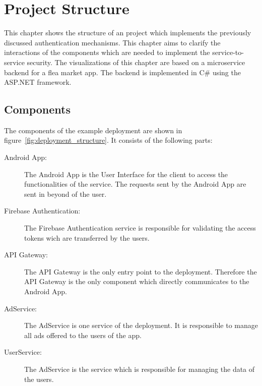 \chapter{Project Structure}
\label{cha:project_structure}
This chapter shows the structure of an project which implements the previously discussed authentication mechanisms.
This chapter aims to clarify the interactions of the components which are needed to implement the service-to-service security.
The visualizations of this chapter are based on a microservice backend for a flea market app.
The backend is implemented in C\# using the ASP.NET framework.

\section{Components}
The components of the example deployment are shown in figure~\ref{fig:deployment_structure}. 
It consists of the following parts:
\begin{description}
	\item[Android App:] The Android App is the User Interface for the client to access the functionalities of the service.
		The requests sent by the Android App are sent in beyond of the user.
	\item[Firebase Authentication:] The Firebase Authentication service is responsible for validating the access tokens wich are transferred by the users.
	\item[API Gateway:] The API Gateway is the only entry point to the deployment.
		Therefore the API Gateway is the only component which directly communicates to the Android App.
	\item[AdService:] The AdService is one service of the deployment.
		It is responsible to manage all ads offered to the users of the app.
	\item[UserService:] The AdService is the service which is responsible for managing the data of the users.
\end{description}

